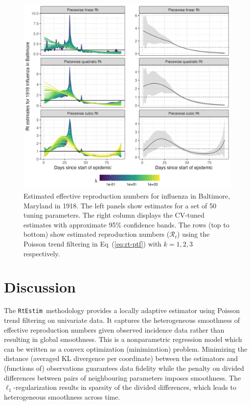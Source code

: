 \documentclass[10pt,letterpaper]{article}
\def\RtEstim{\texttt{RtEstim}}
\def\calR{\mathcal{R}}
\renewcommand{\eqref}[1]{Eq~(\ref{#1})}
\begin{document}
\begin{figure}[!h]
  \centering
  \includegraphics[width=0.9\linewidth]{fig/flu_full_res.png}
  \caption{Estimated effective reproduction numbers for influenza in Baltimore,
  Maryland in 1918. The left panels show estimates for a set of 50 tuning
  parameters. The right column displays the CV-tuned estimates with approximate
  95\% confidence bands. The rows (top to bottom) show estimated reproduction
  numbers ($\calR_t$) using the Poisson trend filtering in \eqref{eq:rt-ptf}
  with $k=1,2,3$ respectively.} 
  \label{fig:flu-res}
\end{figure} 


\section{Discussion}

The \RtEstim\ methodology provides a locally adaptive estimator using Poisson
trend filtering on univariate data. It captures the heterogeneous smoothness of
effective reproduction numbers given observed incidence data rather than
resulting in global smoothness. This is a nonparametric regression model which
can be written as a convex optimization (minimization) problem. Minimizing the
distance (averaged KL divergence per coordinate) between the estimators and
(functions of) observations guarantees data fidelity while the penalty on divided
differences between pairs of neighbouring parameters imposes smoothness. The
$\ell_1$-regularization results in sparsity of the divided differences, which
leads to heterogeneous smoothness across time. 
\end{document}
